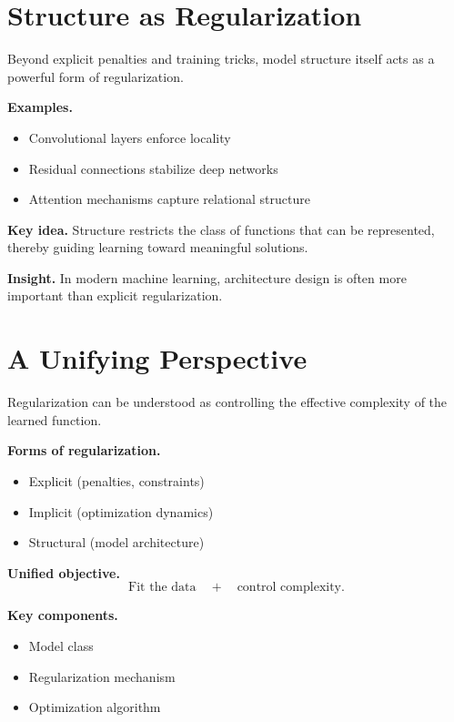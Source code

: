 \section{Structure as Regularization}

Beyond explicit penalties and training tricks, model structure itself acts as a powerful form of regularization.

\medskip

\noindent
\textbf{Examples.}
\begin{itemize}
    \item Convolutional layers enforce locality
    \item Residual connections stabilize deep networks
    \item Attention mechanisms capture relational structure
\end{itemize}

\medskip

\noindent
\textbf{Key idea.}  
Structure restricts the class of functions that can be represented, thereby guiding learning toward meaningful solutions.

\medskip

\noindent
\textbf{Insight.}  
In modern machine learning, architecture design is often more important than explicit regularization.

\section{A Unifying Perspective}

Regularization can be understood as controlling the effective complexity of the learned function.

\medskip

\noindent
\textbf{Forms of regularization.}
\begin{itemize}
    \item Explicit (penalties, constraints)
    \item Implicit (optimization dynamics)
    \item Structural (model architecture)
\end{itemize}

\medskip

\noindent
\textbf{Unified objective.}
\[
\text{Fit the data} \quad + \quad \text{control complexity}.
\]

\medskip

\noindent
\textbf{Key components.}
\begin{itemize}
    \item Model class
    \item Regularization mechanism
    \item Optimization algorithm
\end{itemize}

